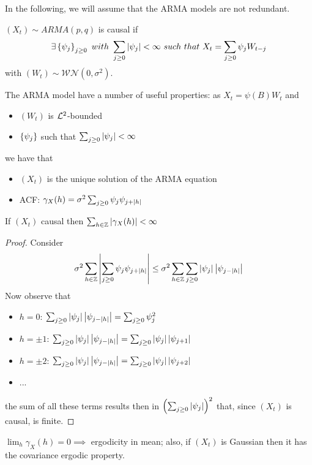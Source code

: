 In the following, we will assume that the ARMA models are not redundant.

\begin{definition}
    $(X_t)\sim ARMA(p,q)$ is causal if
    \[
        \exists\set{\psi_j}_{j\ge0}\ with\ \sum_{j\ge0}\abs{\psi_j}<\infty\ such\ that\ X_t=\sum_{j\ge0}\psi_jW_{t-j}  
    \]
    with $(W_t)\sim\mathcal{WN}(0,\sigma^2)$.
\end{definition}

The ARMA model have a number of useful properties: as $X_t=\psi(B)W_t$ and
\begin{itemize}
    \item $(W_t)$ is $\mathcal{L}^{2}$-bounded
    \item $\left\{\psi_j\right\}$ such that $\sum_{j\ge0}\left|\psi_j\right|<\infty$
\end{itemize}
we have that
\begin{itemize}
    \item $(X_t)$ is the unique solution of the ARMA equation
    \item ACF: $\gamma_X(h)=\sigma^2\sum_{j\ge0}\psi_j\psi_{j+\left|h\right|}$
\end{itemize}

\begin{proposition}
    If $(X_t)$ causal then $\sum_{h\in\mathbb{Z}}\left|\gamma_X(h)\right|<\infty$
\end{proposition}

\begin{proof}
    Consider
    \[
        \sigma^2\sum_{h\in\mathbb{Z}}\left|\sum_{j\ge0}\psi_j\psi_{j+\left|h\right|}\right|\le\sigma^2\sum_{h\in\mathbb{Z}}\sum_{j\ge0}\left|\psi_j\right|\left|\psi_{j-\left|h\right|}\right| 
    \]
    Now observe that
    \begin{itemize}
        \item $h=0$: $\sum_{j\ge0}\left|\psi_j\right|\left|\psi_{j-\left|h\right|}\right|=\sum_{j\ge0}\psi_j^2$
        \item $h=\pm1$: $\sum_{j\ge0}\left|\psi_j\right|\left|\psi_{j-\left|h\right|}\right|=\sum_{j\ge0}\left|\psi_j\right|\left|\psi_{j+1}\right|$
        \item $h=\pm2$: $\sum_{j\ge0}\left|\psi_j\right|\left|\psi_{j-\left|h\right|}\right|=\sum_{j\ge0}\left|\psi_j\right|\left|\psi_{j+2}\right|$
        \item ...
    \end{itemize}
    the sum of all these terms results then in $\left(\sum_{j\ge0}\left|\psi_j\right|\right)^2$ that, since $(X_t)$ is causal, is finite.
\end{proof}

\begin{corollary}
    $\lim_h\gamma_X(h)=0\implies$ ergodicity in mean; also, if $(X_t)$ is Gaussian then it has the covariance ergodic property.
\end{corollary}

